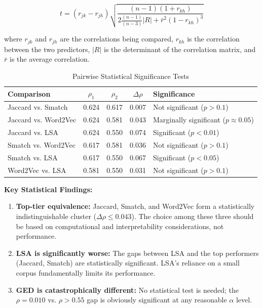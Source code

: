 \documentclass[11pt,a4paper]{article}
\begin{document}
\begin{equation}
t = (r_{jk} - r_{jh}) \sqrt{\frac{(n-1)(1+r_{kh})}{2\frac{(n-1)}{(n-3)}|R| + \bar{r}^2(1-r_{kh})^3}}
\end{equation}

where $r_{jk}$ and $r_{jh}$ are the correlations being compared, $r_{kh}$ is the correlation between the two predictors, $|R|$ is the determinant of the correlation matrix, and $\bar{r}$ is the average correlation.

\begin{table}[h]
\centering
\caption{Pairwise Statistical Significance Tests}
\begin{tabular}{lcccl}
\toprule
\textbf{Comparison} & \textbf{$\rho_1$} & \textbf{$\rho_2$} & \textbf{$\Delta\rho$} & \textbf{Significance} \\
\midrule
Jaccard vs. Smatch & 0.624 & 0.617 & 0.007 & Not significant ($p > 0.1$) \\
Jaccard vs. Word2Vec & 0.624 & 0.581 & 0.043 & Marginally significant ($p \approx 0.05$) \\
Jaccard vs. LSA & 0.624 & 0.550 & 0.074 & Significant ($p < 0.01$) \\
Smatch vs. Word2Vec & 0.617 & 0.581 & 0.036 & Not significant ($p > 0.1$) \\
Smatch vs. LSA & 0.617 & 0.550 & 0.067 & Significant ($p < 0.05$) \\
Word2Vec vs. LSA & 0.581 & 0.550 & 0.031 & Not significant ($p > 0.1$) \\
\bottomrule
\end{tabular}
\end{table}

\textbf{Key Statistical Findings:}

\begin{enumerate}
    \item \textbf{Top-tier equivalence:} Jaccard, Smatch, and Word2Vec form a statistically indistinguishable cluster ($\Delta\rho \leq 0.043$). The choice among these three should be based on computational and interpretability considerations, not performance.
    
    \item \textbf{LSA is significantly worse:} The gaps between LSA and the top performers (Jaccard, Smatch) are statistically significant. LSA's reliance on a small corpus fundamentally limits its performance.
    
    \item \textbf{GED is catastrophically different:} No statistical test is needed; the $\rho = 0.010$ vs. $\rho > 0.55$ gap is obviously significant at any reasonable $\alpha$ level.
\end{enumerate}
\end{document}
